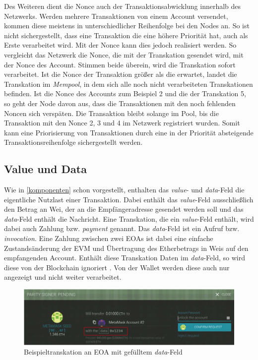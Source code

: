 \documentclass[runningheads]{llncs}
\begin{document}
Des Weiteren dient die Nonce auch der Transaktionsabwicklung innerhalb des Netzwerks.  Werden mehrere Transaktionen von einem Account versendet, kommen diese meistens in unterschiedlicher Reihenfolge bei den Nodes an. So ist nicht sichergestellt, dass eine Transaktion die eine höhere Priorität hat, auch als Erste verarbeitet wird. Mit der Nonce kann dies jedoch realisiert werden. So vergleicht das Netzwerk die Nonce, die mit der Transkation gesendet wird, mit der Nonce des Account. Stimmen beide überein, wird die Transkation sofort verarbeitet. Ist die Nonce der Transaktion größer als die erwartet, landet die Transkation im \textit{Mempool}, in dem sich alle noch nicht verarbeiteten Transkationen befinden. Ist die Nonce des Accounts zum Beispiel 2 und die der Transkation 5, so geht der Node davon aus, dass die Transaktionen mit den noch fehlenden Noncen sich verspäten. Die Transaktion bleibt solange im Pool, bis die Transaktion mit den Nonce 2, 3 und 4 im Netzwerk registriert wurden. Somit kann eine Priorisierung von Transaktionen durch eine in der Priorität absteigende Transaktionsreihenfolge sichergestellt werden.

\subsection{Value und Data}
\label{valData}
Wie in \ref{komponenten} schon vorgestellt, enthalten das \textit{value}- und \textit{data}-Feld die eigentliche Nutzlast einer Transaktion. Dabei enthält das \textit{value}-Feld ausschließlich den Betrag an Wei, der an die Empfängeradresse gesendet werden soll und das \textit{data}-Feld enthält die Nachricht.
Eine Transkation, die ein \textit{value}-Feld enthält, wird dabei auch Zahlung bzw. \textit{payment} genannt. Das \textit{data}-Feld ist ein Aufruf bzw. \textit{invocation}\cite[S.108]{antonopoulos_mastering_2019}. Eine Zahlung zwischen zwei EOAs ist dabei eine einfache Zustandsänderung der EVM und Übertragung des Etherbetrags in Weis auf den empfangenden Account. Enthält diese Transkation Daten im \textit{data}-Feld, so wird diese von der Blockchain ignoriert \cite[S.10]{wood_ethereum/yellowpaper_2019}. Von der Wallet werden diese auch nur angezeigt und nicht weiter verarbeitet.
\begin{figure}[h!]
  \includegraphics[width=\textwidth, keepaspectratio]{dataTransaction.png}
  \caption{Beispieltranskation an EOA mit gefülltem \textit{data}-Feld \cite[S.109]{antonopoulos_mastering_2019}}
\end{figure}
\end{document}
